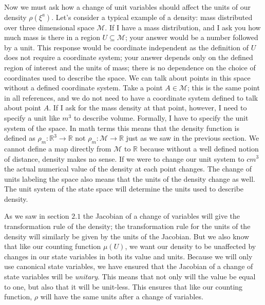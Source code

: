 \documentclass{article}
\begin{document}
	Now we must ask how a change of unit variables should affect the units of our density $\rho(\xi^a)$. Let's consider a typical example of a density: mass distributed over three dimensional space $\mathcal{M}$. If I have a mass distribution, and I ask you how much mass is there in a region $U \subseteq \mathcal{M}$; your answer would be a number followed by a unit. This response would be coordinate independent as the definition of $U$ does not require a coordinate system; your answer depends only on the defined region of interest and the units of mass; there is no dependence on the choice of coordinates used to describe the space. We can talk about points in this space without a defined coordinate system. Take a point $A \in \mathcal{M}$; this is the same point in all references, and we do not need to have a coordinate system defined to talk about point $A$. If I ask for the mass density at that point, however, I need to specify a unit like $m^3$ to describe volume. Formally, I have to specify the unit system of the space. In math terms this means that the density function is defined as $\rho_m : \mathbb{R}^3 \to \mathbb{R}$ not $\rho_m : \mathcal{M} \to \mathbb{R}$ just as we saw in the previous section. We cannot define a map directly from $\mathcal{M}$ to $\mathbb{R}$ because without a well defined notion of distance, density makes no sense. If we were to change our unit system to $cm^3$ the actual numerical value of the density at each point changes. The change of units labeling the space also means that the units of the density change as well. The unit system of the state space will determine the units used to describe density. 
	
	As we saw in section $2.1$ the Jacobian of a change of variables will give the transformation rule of the density; the transformation rule for the units of the density will similarly be given by the units of the Jacobian. But we also know that like our counting function $\mu(U)$, we want our density to be unaffected by changes in our state variables in both its value and units. Because we will only use canonical state variables, we have ensured that the Jacobian of a change of state variables will be \textit{unitary}. This means that not only will the value be equal to one, but also that it will be unit-less. This ensures that like our counting function, $\rho$ will have the same units after a change of variables. 
	
	 
\end{document}
